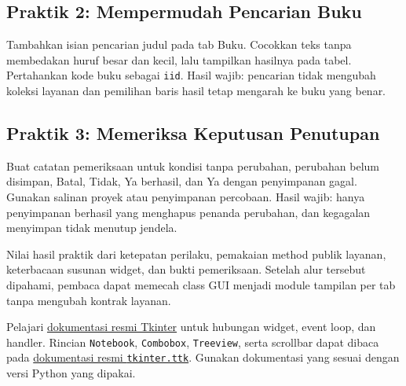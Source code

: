 \subsection{Praktik 2: Mempermudah Pencarian Buku}

Tambahkan isian pencarian judul pada tab Buku. Cocokkan teks tanpa membedakan huruf besar dan kecil, lalu tampilkan hasilnya pada tabel. Pertahankan kode buku sebagai \texttt{iid}. Hasil wajib: pencarian tidak mengubah koleksi layanan dan pemilihan baris hasil tetap mengarah ke buku yang benar.

\subsection{Praktik 3: Memeriksa Keputusan Penutupan}

Buat catatan pemeriksaan untuk kondisi tanpa perubahan, perubahan belum disimpan, Batal, Tidak, Ya berhasil, dan Ya dengan penyimpanan gagal. Gunakan salinan proyek atau penyimpanan percobaan. Hasil wajib: hanya penyimpanan berhasil yang menghapus penanda perubahan, dan kegagalan menyimpan tidak menutup jendela.

Nilai hasil praktik dari ketepatan perilaku, pemakaian method publik layanan, keterbacaan susunan widget, dan bukti pemeriksaan. Setelah alur tersebut dipahami, pembaca dapat memecah class GUI menjadi module tampilan per tab tanpa mengubah kontrak layanan.

\begin{info}
Pelajari \href{https://docs.python.org/3.12/library/tkinter.html}{dokumentasi resmi Tkinter} untuk hubungan widget, event loop, dan handler. Rincian \texttt{Notebook}, \texttt{Combobox}, \texttt{Treeview}, serta scrollbar dapat dibaca pada \href{https://docs.python.org/3.12/library/tkinter.ttk.html}{dokumentasi resmi \texttt{tkinter.ttk}}. Gunakan dokumentasi yang sesuai dengan versi Python yang dipakai.
\end{info}
\endgroup
